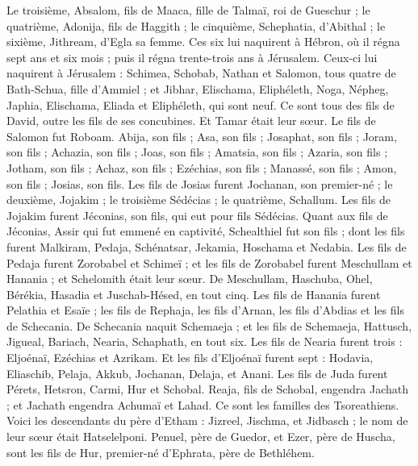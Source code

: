 \begin{multicols}{2}
Le troisième, Absalom, fils de Maaca, fille de Talmaï, roi de Gueschur ; le quatrième, Adonija, fils de Haggith ;
le cinquième, Schephatia, d'Abithal ; le sixième, Jithream, d'Egla sa femme.
Ces six lui naquirent à Hébron, où il régna sept ans et six mois ; puis il régna trente-trois ans à Jérusalem.
Ceux-ci lui naquirent à Jérusalem : Schimea, Schobab, Nathan et Salomon, tous quatre de Bath-Schua, fille d'Ammiel ;
et Jibhar, Elischama, Eliphéleth,
Noga, Népheg, Japhia,
Elischama, Eliada et Eliphéleth, qui sont neuf.
Ce sont tous des fils de David, outre les fils de ses concubines. Et Tamar était leur sœur.
Le fils de Salomon fut Roboam. Abija, son fils ; Asa, son fils ; Josaphat, son fils ;
Joram, son fils ; Achazia, son fils ; Joas, son fils ;
Amatsia, son fils ; Azaria, son fils ; Jotham, son fils ;
Achaz, son fils ; Ezéchias, son fils ; Manassé, son fils ;
Amon, son fils ; Josias, son fils.
Les fils de Josias furent Jochanan, son premier-né ; le deuxième, Jojakim ; le troisième Sédécias ; le quatrième, Schallum.
Les fils de Jojakim furent Jéconias, son fils, qui eut pour fils Sédécias.
Quant aux fils de Jéconias, Assir qui fut emmené en captivité, Schealthiel fut son fils ;
dont les fils furent Malkiram, Pedaja, Schénatsar, Jekamia, Hoschama et Nedabia.
Les fils de Pedaja furent Zorobabel et Schimeï ; et les fils de Zorobabel furent Meschullam et Hanania ; et Schelomith était leur sœur.
De Meschullam, Haschuba, Ohel, Bérékia, Hasadia et Juschab-Hésed, en tout cinq.
Les fils de Hanania furent Pelathia et Esaïe ; les fils de Rephaja, les fils d'Arnan, les fils d'Abdias et les fils de Schecania.
De Schecania naquit Schemaeja ; et les fils de Schemaeja, Hattusch, Jigueal, Bariach, Nearia, Schaphath, en tout six.
Les fils de Nearia furent trois : Eljoénaï, Ezéchias et Azrikam.
Et les fils d'Eljoénaï furent sept : Hodavia, Eliaschib, Pelaja, Akkub, Jochanan, Delaja, et Anani.
\VerseOne{}Les fils de Juda furent Pérets, Hetsron, Carmi, Hur et Schobal.
Reaja, fils de Schobal, engendra Jachath ; et Jachath engendra Achumaï et Lahad. Ce sont les familles des Tsoreathiens.
Voici les descendants du père d'Etham : Jizreel, Jischma, et Jidbasch ; le nom de leur sœur était Hatselelponi.
Penuel, père de Guedor, et Ezer, père de Huscha, sont les fils de Hur, premier-né d'Ephrata, père de Bethléhem.

\end{multicols}
